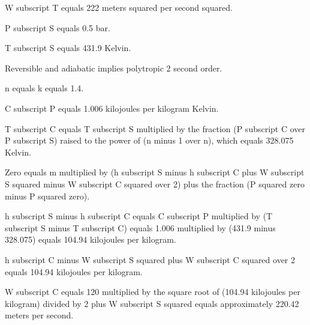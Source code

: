 W subscript T equals 222 meters squared per second squared.

P subscript S equals 0.5 bar.

T subscript S equals 431.9 Kelvin.

Reversible and adiabatic implies polytropic 2 second order.

n equals k equals 1.4.

C subscript P equals 1.006 kilojoules per kilogram Kelvin.

T subscript C equals T subscript S multiplied by the fraction (P subscript C over P subscript S) raised to the power of (n minus 1 over n), which equals 328.075 Kelvin.

Zero equals m multiplied by (h subscript S minus h subscript C plus W subscript S squared minus W subscript C squared over 2) plus the fraction (P squared zero minus P squared zero).

h subscript S minus h subscript C equals C subscript P multiplied by (T subscript S minus T subscript C) equals 1.006 multiplied by (431.9 minus 328.075) equals 104.94 kilojoules per kilogram.

h subscript C minus W subscript S squared plus W subscript C squared over 2 equals 104.94 kilojoules per kilogram.

W subscript C equals 120 multiplied by the square root of (104.94 kilojoules per kilogram) divided by 2 plus W subscript S squared equals approximately 220.42 meters per second.